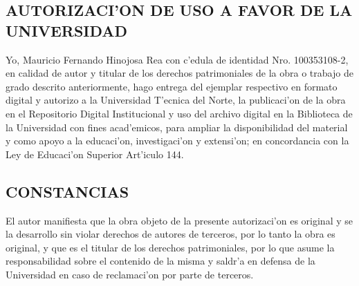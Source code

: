 \begin{center}
\section*{\normalsize AUTORIZACI'ON DE USO A FAVOR DE LA UNIVERSIDAD }

\end{center}

Yo, Mauricio Fernando Hinojosa Rea con c'edula de identidad Nro. 100353108-2, en calidad de autor y titular de los derechos patrimoniales de la obra o trabajo de grado descrito anteriormente, hago entrega del ejemplar respectivo en formato digital y autorizo a la Universidad T'ecnica del Norte, la publicaci'on de la obra en el Repositorio Digital Institucional y uso del archivo digital en la Biblioteca de la Universidad con fines acad'emicos, para ampliar la disponibilidad del material y como apoyo a la educaci'on, investigaci'on y extensi'on; en concordancia con la Ley de Educaci'on Superior Art'iculo 144. 

\begin{center}
\section*{\normalsize CONSTANCIAS}

\end{center}
El autor manifiesta que la obra objeto de la presente autorizaci'on es original y se la desarrollo sin violar derechos de autores de terceros, por lo tanto la obra es original, y que es el titular de los derechos patrimoniales, por lo que asume la responsabilidad sobre el contenido de la misma y saldr'a en defensa de la Universidad en caso de reclamaci'on por parte de terceros. 
